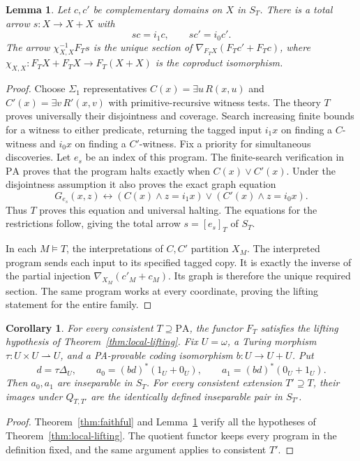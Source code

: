 \documentclass[11pt]{article}
\newtheorem{lemma}[theorem]{Lemma}
\newtheorem{corollary}[theorem]{Corollary}
\newcommand{\PA}{\mathrm{PA}}
\begin{document}
\begin{lemma}\label{lem:switch}
Let $c,c'$ be complementary domains on $X$ in $S_T$. There is a total
arrow $s:X\to X+X$ with
\[
 sc=i_1c,\qquad sc'=i_0c'.
\]
The arrow $\chi_{X,X}^{-1}F_Ts$ is the unique section of
$\nabla_{F_TX}(F_Tc'+F_Tc)$, where
$\chi_{X,X}:F_TX+F_TX\to F_T(X+X)$ is the coproduct isomorphism.
\end{lemma}
\begin{proof}
Choose $\Sigma_1$ representatives $C(x)=\exists u\,R(x,u)$ and
$C'(x)=\exists v\,R'(x,v)$ with primitive-recursive witness tests.
The theory $T$ proves universally their disjointness and coverage.
Search increasing finite bounds for a witness to either predicate,
returning the tagged input $i_1x$ on finding a $C$-witness and $i_0x$
on finding a $C'$-witness. Fix a priority for simultaneous discoveries.
Let $e_s$ be an index of this program. The finite-search verification
in $\PA$ proves that the program halts
exactly when $C(x)\lor C'(x)$. Under the disjointness assumption it also
proves the exact graph equation
\[
 G_{e_s}(x,z)\leftrightarrow
 (C(x)\land z=i_1x)\lor(C'(x)\land z=i_0x).
\]
Thus $T$ proves this equation and universal halting. The equations for
the restrictions follow, giving the total arrow $s=[e_s]_T$ of $S_T$.

In each $M\models T$, the interpretations of $C,C'$ partition $X_M$.
The interpreted program sends each input to its specified tagged copy.
It is exactly the inverse of the partial injection
$\nabla_{X_M}(c'_M+c_M)$. Its graph is therefore the unique required
section. The same program works at every coordinate, proving the lifting
statement for the entire family.
\end{proof}

\begin{corollary}\label{cor:pair}
For every consistent $T\supseteq\PA$, the functor $F_T$ satisfies the
lifting hypothesis of Theorem~\ref{thm:local-lifting}.
Fix $U=\omega$, a Turing morphism $\tau:U\times U\rightharpoonup U$,
and a PA-provable coding isomorphism $b:U\to U+U$. Put
\[
 d=\tau\Delta_U,\qquad
 a_0=(bd)^*(1_U+0_U),\qquad a_1=(bd)^*(0_U+1_U).
\]
Then $a_0,a_1$ are inseparable in $S_T$. For every consistent
extension $T'\supseteq T$, their images under $Q_{T,T'}$ are the
identically defined inseparable pair in $S_{T'}$.
\end{corollary}
\begin{proof}
Theorem~\ref{thm:faithful} and Lemma~\ref{lem:switch} verify all the
hypotheses of Theorem~\ref{thm:local-lifting}. The quotient functor keeps
every program in the definition fixed, and the same argument applies
to consistent $T'$.
\end{proof}
\end{document}
